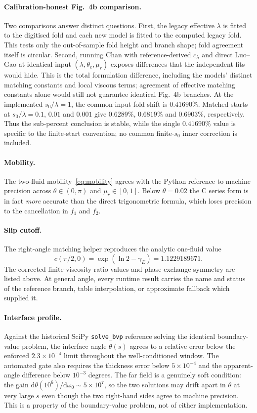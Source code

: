 \documentclass[11pt,a4paper]{article}
\newcommand{\dd}{\mathrm{d}}
\newcommand{\mur}{\mu_r}
\begin{document}
\paragraph{Calibration-honest Fig.~4b comparison.}
Two comparisons answer distinct questions. First, the legacy effective
$\lambda$ is fitted to the digitised fold and each new model is fitted to the
computed legacy fold. This tests only the out-of-sample fold height and branch
shape; fold agreement itself is circular.
Second, running Chan with reference-derived $c_{\lambda}$ and direct Luo--Gao
at identical input $(\lambda,\theta_e,\mur)$ exposes differences that the
independent fits would hide. This is the total formulation difference,
including the models' distinct matching constants and local viscous terms;
agreement of effective matching constants alone would still not guarantee
identical Fig.~4b branches. At the implemented $s_0/\lambda=1$, the common-input
fold shift is $0.41690\%$. Matched starts at $s_0/\lambda=0.1$, $0.01$ and
$0.001$ give $0.6289\%$, $0.6819\%$ and $0.6903\%$, respectively. Thus the
sub-percent conclusion is stable, while the single $0.41690\%$ value is
specific to the finite-start convention; no common finite-$s_0$ inner
correction is included.

\paragraph{Mobility.}
The two-fluid mobility~\eqref{eq:mobility} agrees with the Python reference to
machine precision across $\theta \in (0,\pi)$ and $\mur \in [0,1]$. Below
$\theta = 0.02$ the C series form is in fact \emph{more} accurate than the
direct trigonometric formula, which loses precision to the cancellation in
$f_1$ and $f_2$.

\paragraph{Slip cutoff.}
The right-angle matching helper reproduces the analytic one-fluid value
\[
  c(\pi/2,0)=\exp(\ln 2-\gamma_E)=1.1229189671.
\]
The corrected finite-viscosity-ratio values and phase-exchange symmetry are
listed above. At general angle, every runtime result carries the name and
status of the reference branch, table interpolation, or approximate fallback
which supplied it.

\paragraph{Interface profile.}
Against the historical SciPy \texttt{solve\_bvp} reference solving the
identical boundary-value problem, the interface angle $\theta(s)$ agrees to a
relative error below the enforced $2.3\times10^{-4}$ limit throughout the
well-conditioned window. The automated gate also requires the thickness error
below $5\times10^{-4}$ and the apparent-angle difference below $10^{-3}$
degrees.
The far field is a genuinely soft condition: the gain
$\dd\theta(10^{6})/\dd\omega_0 \sim 5\times10^{7}$, so the two solutions may
drift apart in $\theta$ at very large $s$ even though the two right-hand sides
agree to machine precision. This is a property of the boundary-value problem,
not of either implementation.
\end{document}
